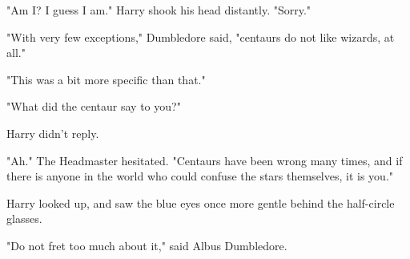 "Am I? I guess I am." Harry shook his head distantly. "Sorry."

"With very few exceptions," Dumbledore said, "centaurs do not like wizards, at 
all."

"This was a bit more specific than that."

"What did the centaur say to you?"

Harry didn't reply.

"Ah." The Headmaster hesitated. "Centaurs have been wrong many times, and if 
there is anyone in the world who could confuse the stars themselves, it is you."

Harry looked up, and saw the blue eyes once more gentle behind the half-circle 
glasses.

"Do not fret too much about it," said Albus Dumbledore.